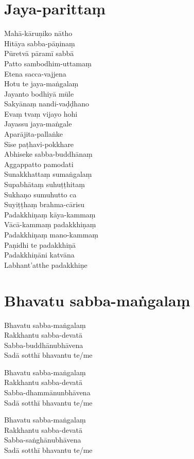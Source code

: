 \clearpage

\chapter{Jaya-parittaṃ}%


\begin{paritta}

Mahā-kāruṇiko nātho\\
Hitāya sabba-pāṇinaṃ\\
Pūretvā pāramī sabbā\\
Patto sambodhim-uttamaṃ\\
Etena sacca-vajjena\\
Hotu te jaya-maṅgalaṃ\\
Jayanto bodhiyā mūle\\
Sakyānaṃ nandi-vaḍḍhano\\
Evaṃ tvaṃ vijayo hohi\\
Jayassu jaya-maṅgale\\
Aparājita-pallaṅke\\
Sīse paṭhavi-pokkhare\\
Abhiseke sabba-buddhānaṃ\\
Aggappatto pamodati\\
Sunakkhattaṃ sumaṅgalaṃ\\
Supabhātaṃ suhuṭṭhitaṃ\\
Sukhaṇo sumuhutto ca\\
Suyiṭṭhaṃ brahma-cārisu\\
Padakkhiṇaṃ kāya-kammaṃ\\
Vācā-kammaṃ padakkhiṇaṃ\\
Padakkhiṇaṃ mano-kammaṃ\\
Paṇidhi te padakkhiṇā\\
Padakkhiṇāni katvāna\\
Labhant'atthe padakkhiṇe

\end{paritta}

\clearpage

\chapter{Bhavatu sabba-maṅgalaṃ}%


\begin{paritta}
Bhavatu sabba-maṅgalaṃ\\
Rakkhantu sabba-devatā\\
Sabba-buddhānubhāvena\\
Sadā sotthī bhavantu te/me

Bhavatu sabba-maṅgalaṃ\\
Rakkhantu sabba-devatā\\
Sabba-dhammānunbhāvena\\
Sadā sotthī bhavantu te/me

Bhavatu sabba-maṅgalaṃ\\
Rakkhantu sabba-devatā\\
Sabba-saṅghānubhāvena\\
Sadā sotthī bhavantu te/me
\end{paritta}

